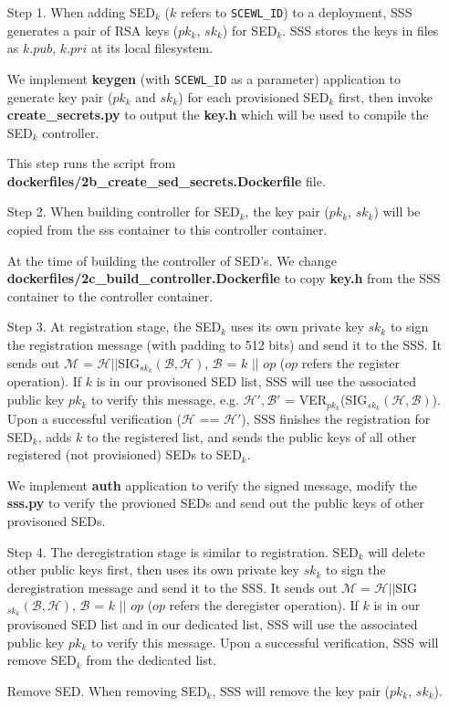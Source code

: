 \documentclass[11pt,oneside,onecolumn,letterpaper]{article}
\begin{document}
\begin{itemize}
  \item[Step 1.] When adding SED$_k$ ($k$ refers to \verb|SCEWL_ID|) to a deployment, SSS generates a pair of RSA keys ($pk_k$, $sk_k$) for SED$_k$.
  SSS stores the keys in files as $k.pub$, $k.pri$ at its local filesystem.
  
  We implement \textbf{keygen} (with \verb|SCEWL_ID| as a parameter) application to generate key pair ($pk_k$ and $sk_k$) for each provisioned SED$_k$ first, then invoke \textbf{create\_secrets.py} to output the \textbf{key.h} which will be used to compile the SED$_k$ controller.

  This step runs the script from \textbf{dockerfiles/2b\_create\_sed\_secrets.Dockerfile} file.

  \item[Step 2.] When building controller for SED$_k$, the key pair ($pk_k$, $sk_k$) will be copied from the sss container to this controller container.
  
  At the time of building the controller of SED's.
  We change \textbf{dockerfiles/2c\_build\_controller.Dockerfile} to copy \textbf{key.h} from the SSS container to the controller container.

  \item[Step 3.] At registration stage, the SED$_k$ uses its own private key $sk_k$ to sign the registration message (with padding to 512 bits) and send it to the SSS.
  It sends out $\mathcal{M}$ = $\mathcal{H} || $SIG$_{sk_k}(\mathcal{B}, \mathcal{H})$, $\mathcal{B}$ = $k$ $||$ $op$ ($op$ refers the register operation).
  If $k$ is in our provisoned SED list, SSS will use the associated public key $pk_k$ to verify this message, e.g. $\mathcal{H'}, \mathcal{B'}$ = VER$_{pk_k}$(SIG$_{sk_k}(\mathcal{H}, \mathcal{B})$).
  Upon a successful verification ($\mathcal{H}$ == $\mathcal{H'}$), SSS finishes the registration for SED$_k$, adds $k$ to the registered list, and sends the public keys of all other registered (not provisioned) SEDs to SED$_k$.
  
  We implement \textbf{auth} application to verify the signed message, modify the \textbf{sss.py} to verify the provioned SEDs and send out the public keys of other provisoned SEDs.

  \item[Step 4.] The deregistration stage is similar to registration.
  SED$_k$ will delete other public keys first, then uses its own private key $sk_k$ to sign the deregistration message and send it to the SSS.
  It sends out $\mathcal{M}$ = $\mathcal{H} || $SIG$_{sk_k}(\mathcal{B}, \mathcal{H})$, $\mathcal{B}$ = $k$ $||$ $op$ ($op$ refers the deregister operation).
  If $k$ is in our provisoned SED list and in our dedicated list, SSS will use the associated public key $pk_k$ to verify this message.
  Upon a successful verification, SSS will remove SED$_k$ from the dedicated list.

  \item[Remove SED.] When removing SED$_k$, SSS will remove the key pair ($pk_k$, $sk_k$).
\end{itemize}
\end{document}
